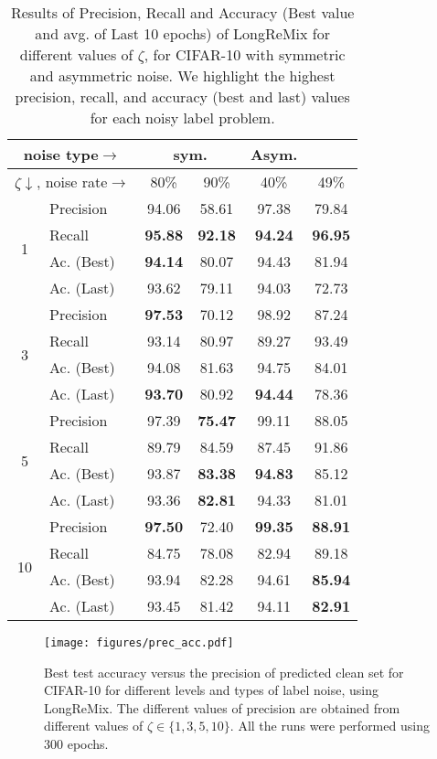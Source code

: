 \documentclass[review]{elsarticle}
\begin{document}
\begin{table}[ht]
\centering
\scriptsize
\begin{tabular}{cl||cc|cc}
\toprule
\multicolumn{2}{c}{noise type$\rightarrow$}& \multicolumn{2}{c}{sym.}& Asym. \\
\midrule
\multicolumn{2}{c}{$\zeta\downarrow$, noise rate$\rightarrow$} & 80\% & 90\% & 40\% & 49\% \\
\midrule
\multirow{4}{*}{1}& Precision  &94.06 & 58.61 & 97.38& 79.84 \\ 
& Recall  & \textbf{95.88} &  \textbf{92.18}& \textbf{94.24}& \textbf{96.95} \\ 
& Ac. (Best) & \textbf{94.14} &80.07 & 94.43& 81.94\\ 
& Ac. (Last)  &93.62 & 79.11 & 94.03& 72.73\\ 
\midrule
\multirow{4}{*}{3}& Precision &\textbf{97.53} &70.12 &98.92 & 87.24\\ 
& Recall  &93.14 &80.97 & 89.27 & 93.49\\ 
& Ac. (Best) &94.08 &81.63 & 94.75 & 84.01\\ 
& Ac. (Last) &\textbf{93.70} &80.92 & \textbf{94.44}&78.36\\ 
\midrule
\multirow{4}{*}{5}& Precision &97.39 &\textbf{75.47} & 99.11& 88.05\\ 
& Recall  &89.79 & 84.59& 87.45& 91.86\\ 
& Ac. (Best)  &93.87 &\textbf{83.38} & \textbf{94.83}& 85.12\\ 
& Ac. (Last)  &93.36 &\textbf{82.81} & 94.33& 81.01\\ 
\midrule
\multirow{4}{*}{10}& Precision & \textbf{97.50} &72.40 & \textbf{99.35}& \textbf{88.91}\\ 
& Recall & 84.75 &78.08 & 82.94&89.18\\ 
& Ac. (Best)  &93.94 &82.28 & 94.61& \textbf{85.94}\\ 
& Ac. (Last) &93.45 &81.42 & 94.11& \textbf{82.91}\\ 
\bottomrule
\end{tabular}
\caption{Results of Precision, Recall and Accuracy (Best value and avg. of Last 10 epochs) of LongReMix for different values of $\zeta$, for CIFAR-10 with symmetric and asymmetric noise. We highlight the highest precision, recall, and accuracy (best and last) values for each noisy label problem.}
\label{tab:confidence_window}
\end{table}


\begin{figure}[t]
\centering
\texttt{[image: figures/prec\_acc.pdf]}
\caption{Best test accuracy versus the precision of predicted clean set for CIFAR-10 for different levels and types of label noise, using LongReMix. The different values of precision are obtained from  different values of $\zeta\in\{1,3,5,10\}$. All the runs were performed using 300 epochs. 
}
\label{fig:prec_acc}
\end{figure}
\end{document}
